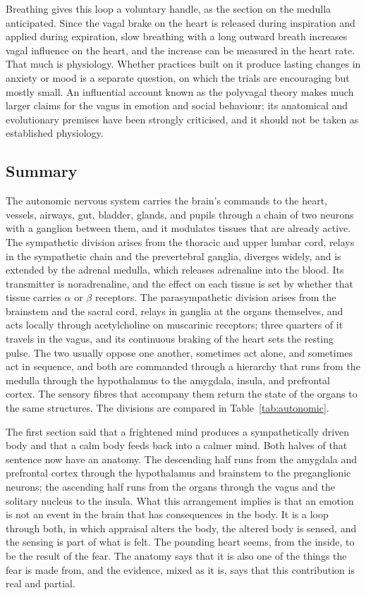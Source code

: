 \documentclass[11pt]{article}
\begin{document}
Breathing gives this loop a voluntary handle, as the section on the medulla anticipated. Since the vagal brake on the heart is released during inspiration and applied during expiration, slow breathing with a long outward breath increases vagal influence on the heart, and the increase can be measured in the heart rate. That much is physiology. Whether practices built on it produce lasting changes in anxiety or mood is a separate question, on which the trials are encouraging but mostly small. An influential account known as the polyvagal theory makes much larger claims for the vagus in emotion and social behaviour; its anatomical and evolutionary premises have been strongly criticised, and it should not be taken as established physiology.

\subsection{Summary}

The autonomic nervous system carries the brain's commands to the heart, vessels, airways, gut, bladder, glands, and pupils through a chain of two neurons with a ganglion between them, and it modulates tissues that are already active. The sympathetic division arises from the thoracic and upper lumbar cord, relays in the sympathetic chain and the prevertebral ganglia, diverges widely, and is extended by the adrenal medulla, which releases adrenaline into the blood. Its transmitter is noradrenaline, and the effect on each tissue is set by whether that tissue carries $\alpha$ or $\beta$ receptors. The parasympathetic division arises from the brainstem and the sacral cord, relays in ganglia at the organs themselves, and acts locally through acetylcholine on muscarinic receptors; three quarters of it travels in the vagus, and its continuous braking of the heart sets the resting pulse. The two usually oppose one another, sometimes act alone, and sometimes act in sequence, and both are commanded through a hierarchy that runs from the medulla through the hypothalamus to the amygdala, insula, and prefrontal cortex. The sensory fibres that accompany them return the state of the organs to the same structures. The divisions are compared in Table~\ref{tab:autonomic}.

The first section said that a frightened mind produces a sympathetically driven body and that a calm body feeds back into a calmer mind. Both halves of that sentence now have an anatomy. The descending half runs from the amygdala and prefrontal cortex through the hypothalamus and brainstem to the preganglionic neurons; the ascending half runs from the organs through the vagus and the solitary nucleus to the insula. What this arrangement implies is that an emotion is not an event in the brain that has consequences in the body. It is a loop through both, in which appraisal alters the body, the altered body is sensed, and the sensing is part of what is felt. The pounding heart seems, from the inside, to be the result of the fear. The anatomy says that it is also one of the things the fear is made from, and the evidence, mixed as it is, says that this contribution is real and partial.
\end{document}

